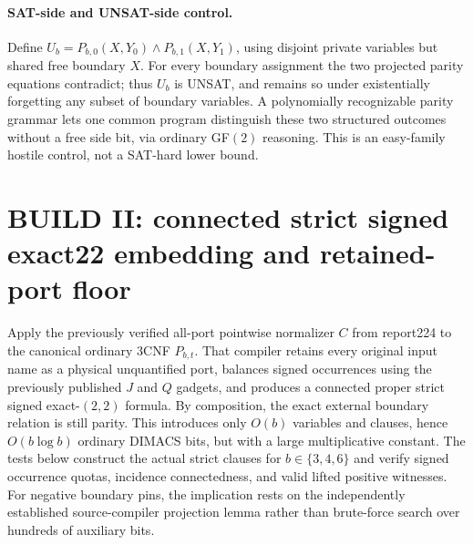 \documentclass[11pt]{article}
\begin{document}
\paragraph{SAT-side and UNSAT-side control.} Define $U_b=P_{b,0}(X,Y_0)\land P_{b,1}(X,Y_1)$, using disjoint private variables but shared free boundary $X$. For every boundary assignment the two projected parity equations contradict; thus $U_b$ is UNSAT, and remains so under existentially forgetting any subset of boundary variables. A polynomially recognizable parity grammar lets one common program distinguish these two structured outcomes without a free side bit, via ordinary GF$(2)$ reasoning. This is an easy-family hostile control, not a SAT-hard lower bound.

\section{BUILD II: connected strict signed exact22 embedding and retained-port floor}
Apply the previously verified all-port pointwise normalizer $C$ from report224 to the canonical ordinary 3CNF $P_{b,t}$. That compiler retains every original input name as a physical unquantified port, balances signed occurrences using the previously published $J$ and $Q$ gadgets, and produces a connected proper strict signed exact-$(2,2)$ formula. By composition, the exact external boundary relation is still parity. This introduces only $O(b)$ variables and clauses, hence $O(b\log b)$ ordinary DIMACS bits, but with a large multiplicative constant. The tests below construct the actual strict clauses for $b\in\{3,4,6\}$ and verify signed occurrence quotas, incidence connectedness, and valid lifted positive witnesses. For negative boundary pins, the implication rests on the independently established source-compiler projection lemma rather than brute-force search over hundreds of auxiliary bits.
\end{document}
